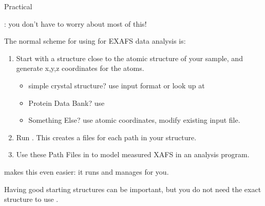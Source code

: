 \begin{slide}{ Practical {\feff} }

{}: you don't have to worry about most of this!

\vmm
\pause
The normal scheme for using {\feff} for EXAFS data analysis  is:

\begin{enumerate}
\item Start with a structure close to the {} atomic structure
  of your sample, and generate x,y,z coordinates for the atoms.
  \begin{itemize}
    \item simple crystal structure?   use {} input
      format or look up at
      {}
    \item Protein Data Bank?          use {}
    \item Something Else?   use atomic coordinates, modify
      existing input file.
  \end{itemize}
  \pause
\item Run {\feff}.  This creates a {\feffndat} files for each
  path in your structure.
  \pause
\item Use these  Path Files in to model measured XAFS in an analysis
  program.
\end{enumerate}

\vmm \pause
{\artemis} makes this even easier: it runs and manages {\feff} for you.


\vmm \pause

\begin{cenpage}{80mm}
  Having good starting structures can be important, but you do not need the
  exact structure to use {\feff}.
\end{cenpage}

\end{slide}

